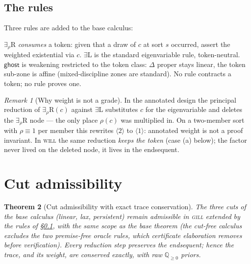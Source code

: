 \documentclass[11pt]{article}
\newcommand{\QQ}{\mathbb{Q}}                     %
\newcommand{\gill}{\textsc{gill}}                %
\newcommand{\will}{\textsc{will}}                %
\newcommand{\erho}[2]{\exists_{\rho}\, #1{:}#2.\;} %
\newcommand{\dtok}[2]{\mathsf{drawn}\;#1\;#2}      %
\newcommand{\ghost}{\mathsf{ghost}}
\newcommand{\seq}[3]{#1;\;#2\vdash #3}             %
\newtheorem{theorem}{Theorem}[section]
\theoremstyle{definition}
\theoremstyle{remark}
\newtheorem{remark}[theorem]{Remark}
\begin{document}
\subsection{The rules}
\label{subsec:rules}

Three rules are added to the base calculus:


$\exists_\rho$R \emph{consumes} a token: given that a draw of $c$ at
sort $s$ occurred, assert the weighted existential via $c$.
$\exists$L is the standard eigenvariable rule, token-neutral.
$\ghost$ is weakening restricted to the token class: $\Delta$ proper
stays linear, the token sub-zone is affine (mixed-discipline zones are
standard).  No rule contracts a token; no rule proves one.

\begin{remark}[Why weight is not a grade]\label{rem:notagrade}
In the annotated design the principal reduction of
$\exists_\rho$R$(c)$ against $\exists$L substitutes $c$ for the
eigenvariable and deletes the $\exists_\rho$R node --- the only place
$\rho(c)$ was multiplied in.  On a two-member sort with
$\rho \equiv 1$ per member this rewrites $\langle 2\rangle$ to
$\langle 1\rangle$: annotated weight is not a proof invariant.  In
\will{} the same reduction \emph{keeps the token} (case (a) below); the
factor never lived on the deleted node, it lives in the endsequent.
\end{remark}

\section{Cut admissibility}
\label{sec:cut}

\begin{theorem}[Cut admissibility with exact trace conservation]
\label{thm:cut}
The three cuts of the base calculus (linear, lax, persistent) remain
admissible in \gill{} extended by the rules of \S\ref{subsec:rules},
with the same scope as the base theorem (the cut-free calculus excludes
the two premise-free oracle rules, which certificate elaboration
removes before verification).  Every reduction step preserves the
endsequent; hence the trace, and its weight, are conserved
\emph{exactly}, with raw $\QQ_{\geq0}$ priors.
\end{theorem}
\end{document}
